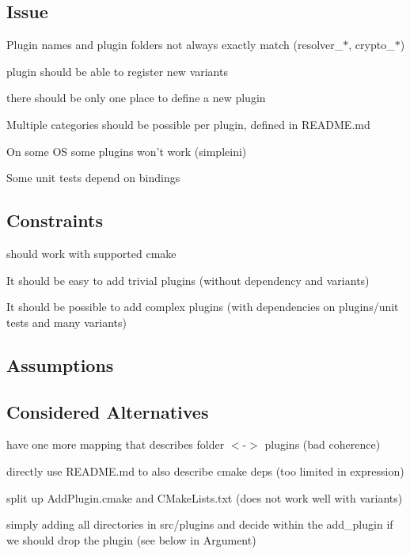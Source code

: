 \subsection*{Issue}


\begin{DoxyItemize}
\item Plugin names and plugin folders not always exactly match (resolver\+\_\+$\ast$, crypto\+\_\+$\ast$)
\item plugin should be able to register new variants
\item there should be only one place to define a new plugin
\item Multiple categories should be possible per plugin, defined in R\+E\+A\+D\+M\+E.\+md
\item On some O\+S some plugins won't work (simpleini)
\item Some unit tests depend on bindings
\end{DoxyItemize}

\subsection*{Constraints}


\begin{DoxyItemize}
\item should work with supported cmake
\item It should be easy to add trivial plugins (without dependency and variants)
\item It should be possible to add complex plugins (with dependencies on plugins/unit tests and many variants)
\end{DoxyItemize}

\subsection*{Assumptions}

\subsection*{Considered Alternatives}


\begin{DoxyItemize}
\item have one more mapping that describes folder $<$-\/$>$ plugins (bad coherence)
\item directly use R\+E\+A\+D\+M\+E.\+md to also describe cmake deps (too limited in expression)
\item split up Add\+Plugin.\+cmake and C\+Make\+Lists.\+txt (does not work well with variants)
\item simply adding all directories in src/plugins and decide within the {\ttfamily add\+\_\+plugin} if we should drop the plugin (see below in Argument)
\end{DoxyItemize}

